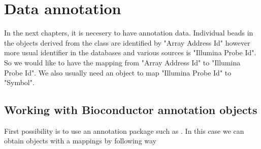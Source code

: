 \section{Data annotation}
In the next chapters, it is necesery to have annotation data. Individual beads in the objects derived from the class  are identified by "Array Address Id" however more usual identifier in the databases and various sources is "Illumina Probe Id". So we would like to have the mapping from "Array Address Id" to "Illumina Probe Id". We also usually need an object to map "Illumina Probe Id" to "Symbol".

\subsection{Working with Bioconductor annotation objects}
First possibility is to use an annotation package such as . In this case we can obtain objects with a mappings by following way